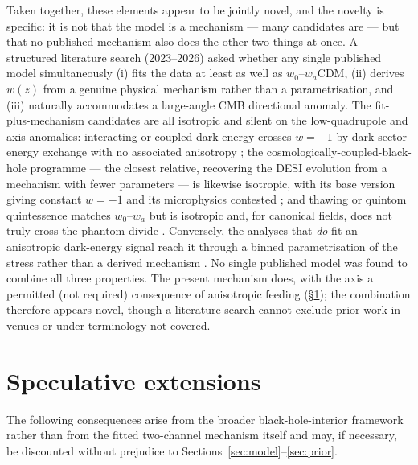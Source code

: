 \documentclass[11pt,a4paper]{article}
\begin{document}
Taken together, these elements appear to be jointly novel, and the novelty is specific: it is not that the model is a mechanism --- many candidates are --- but that no published mechanism also does the other two things at once. A structured literature search (2023--2026) asked whether any single published model simultaneously (i) fits the data at least as well as $w_0$--$w_a$CDM, (ii) derives $w(z)$ from a genuine physical mechanism rather than a parametrisation, and (iii) naturally accommodates a large-angle CMB directional anomaly. The fit-plus-mechanism candidates are all isotropic and silent on the low-quadrupole and axis anomalies: interacting or coupled dark energy crosses $w=-1$ by dark-sector energy exchange with no associated anisotropy \citep{DasCorasanitiKhoury2006,Antusch2026}; the cosmologically-coupled-black-hole programme --- the closest relative, recovering the DESI evolution from a mechanism with fewer parameters --- is likewise isotropic, with its base version giving constant $w=-1$ and its microphysics contested \citep{Croker2024,GaurVisser2024}; and thawing or quintom quintessence matches $w_0$--$w_a$ but is isotropic and, for canonical fields, does not truly cross the phantom divide \citep{DindaMaartens2025}. Conversely, the analyses that \emph{do} fit an anisotropic dark-energy signal reach it through a binned parametrisation of the stress rather than a derived mechanism \citep{IsotropyDESI2026}. No single published model was found to combine all three properties. The present mechanism does, with the axis a permitted (not required) consequence of anisotropic feeding (\S\ref{sec:speculative}); the combination therefore appears novel, though a literature search cannot exclude prior work in venues or under terminology not covered.

\section{Speculative extensions}\label{sec:speculative}

The following consequences arise from the broader black-hole-interior framework rather than from the fitted two-channel mechanism itself and may, if necessary, be discounted without prejudice to Sections~\ref{sec:model}--\ref{sec:prior}.
\end{document}
